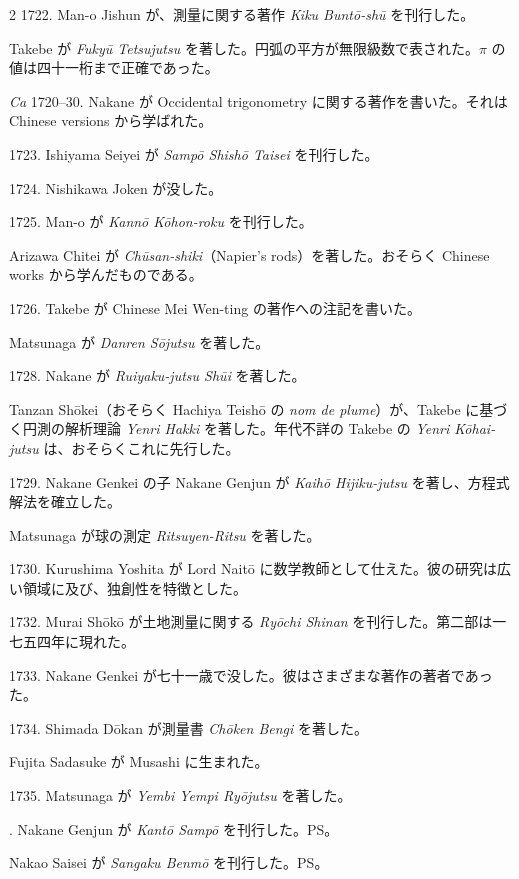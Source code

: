 \documentclass[11pt]{article}
\newcommand{\scanpage}[2]{\clearpage\setcounter{footnote}{0}\noindent{\footnotesize\color{gray}PDF #1 頁 · #2}\par\medskip}
\begin{document}
\scanpage{0197}{第23章年表、印刷頁183}
\begin{multicols}{2}\small
1722. Man-o Jishun が、測量に関する著作 \emph{Kiku Buntō-shū} を刊行した。

Takebe が \emph{Fukyū Tetsujutsu} を著した。円弧の平方が無限級数で表された。$\pi$ の値は四十一桁まで正確であった。

\emph{Ca} 1720--30. Nakane が Occidental trigonometry に関する著作を書いた。それは Chinese versions から学ばれた。

1723. Ishiyama Seiyei が \emph{Sampō Shishō Taisei} を刊行した。

1724. Nishikawa Joken が没した。

1725. Man-o が \emph{Kannō Kōhon-roku} を刊行した。

Arizawa Chitei が \emph{Chūsan-shiki}（Napier's rods）を著した。おそらく Chinese works から学んだものである。

1726. Takebe が Chinese Mei Wen-ting の著作への注記を書いた。

Matsunaga が \emph{Danren Sōjutsu} を著した。

1728. Nakane が \emph{Ruiyaku-jutsu Shūi} を著した。

Tanzan Shōkei（おそらく Hachiya Teishō の \emph{nom de plume}）が、Takebe に基づく円測の解析理論 \emph{Yenri Hakki} を著した。年代不詳の Takebe の \emph{Yenri Kōhai-jutsu} は、おそらくこれに先行した。

1729. Nakane Genkei の子 Nakane Genjun が \emph{Kaihō Hijiku-jutsu} を著し、方程式解法を確立した。

Matsunaga が球の測定 \emph{Ritsuyen-Ritsu} を著した。

1730. Kurushima Yoshita が Lord Naitō に数学教師として仕えた。彼の研究は広い領域に及び、独創性を特徴とした。

1732. Murai Shōkō が土地測量に関する \emph{Ryōchi Shinan} を刊行した。第二部は一七五四年に現れた。

1733. Nakane Genkei が七十一歳で没した。彼はさまざまな著作の著者であった。

1734. Shimada Dōkan が測量書 \emph{Chōken Bengi} を著した。

Fujita Sadasuke が Musashi に生まれた。

1735. Matsunaga が \emph{Yembi Yempi Ryōjutsu} を著した。

. Nakane Genjun が \emph{Kantō Sampō} を刊行した。PS。

Nakao Saisei が \emph{Sangaku Benmō} を刊行した。PS。


\end{multicols}
\end{document}
